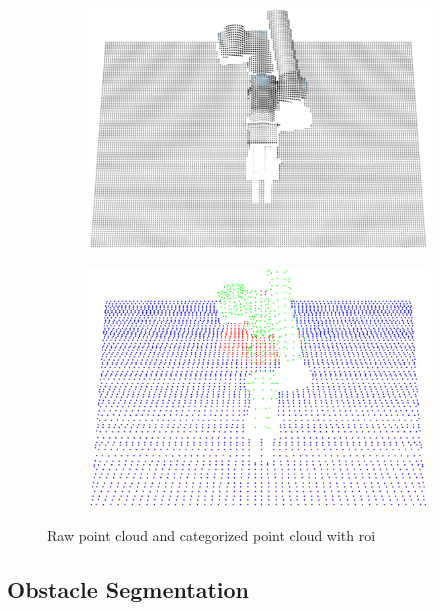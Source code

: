 \begin{figure}[h]
    \centering
    \begin{subfigure}{.5\linewidth}
      \centering
      \includegraphics[width=.95\linewidth]{figs/chp4/cloud_before.png}
    \end{subfigure}%
    \begin{subfigure}{.5\linewidth}
      \centering
      \includegraphics[width=.95\linewidth]{figs/chp4/cloud_after.png}
    \end{subfigure}
    \caption{Raw point cloud and categorized point cloud with \ac{roi}}
    \label{fig:self_ident_result}
\end{figure}



\subsection{Obstacle Segmentation}

